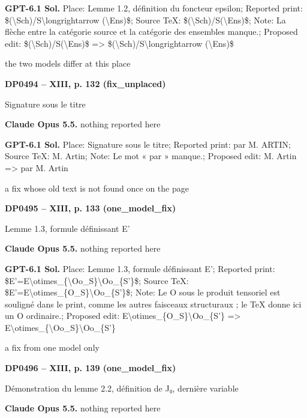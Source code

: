\textbf{GPT-6.1 Sol.} Place: Lemme 1.2, définition du foncteur epsilon; Reported print: \$(\textbackslash{}Sch)/S\textbackslash{}longrightarrow (\textbackslash{}Ens)\$; Source TeX: \$(\textbackslash{}Sch)/S(\textbackslash{}Ens)\$; Note: La flèche entre la catégorie source et la catégorie des ensembles manque.; Proposed edit: \$(\textbackslash{}Sch)/S(\textbackslash{}Ens)\$ =\allowbreak > \$(\textbackslash{}Sch)/S\textbackslash{}longrightarrow (\textbackslash{}Ens)\$\par
the two models differ at this place\par
\par\noindent\hypertarget{DP0494}{}\textbf{DP0494 -- XIII, p. 132 (fix\_unplaced)}\par
Signature sous le titre\par
\textbf{Claude Opus 5.5.} nothing reported here\par
\textbf{GPT-6.1 Sol.} Place: Signature sous le titre; Reported print: par M. ARTIN; Source TeX: M. Artin; Note: Le mot « par » manque.; Proposed edit: M. Artin =\allowbreak > par M. Artin\par
a fix whose old text is not found once on the page\par
\par\noindent\hypertarget{DP0495}{}\textbf{DP0495 -- XIII, p. 133 (one\_model\_fix)}\par
Lemme 1.3, formule définissant E'\par
\textbf{Claude Opus 5.5.} nothing reported here\par
\textbf{GPT-6.1 Sol.} Place: Lemme 1.3, formule définissant E'; Reported print: \$E'=\allowbreak E\textbackslash{}otimes\_\{\textbackslash{}Oo\_S\}\textbackslash{}Oo\_\{S'\}\$; Source TeX: \$E'=\allowbreak E\textbackslash{}otimes\_\{O\_S\}\textbackslash{}Oo\_\{S'\}\$; Note: Le O sous le produit tensoriel est souligné dans le print, comme les autres faisceaux structuraux ; le TeX donne ici un O ordinaire.; Proposed edit: E\textbackslash{}otimes\_\{O\_S\}\textbackslash{}Oo\_\{S'\} =\allowbreak > E\textbackslash{}otimes\_\{\textbackslash{}Oo\_S\}\textbackslash{}Oo\_\{S'\}\par
a fix from one model only\par
\par\noindent\hypertarget{DP0496}{}\textbf{DP0496 -- XIII, p. 139 (one\_model\_fix)}\par
Démonstration du lemme 2.2, définition de J₀, dernière variable\par
\textbf{Claude Opus 5.5.} nothing reported here\par
